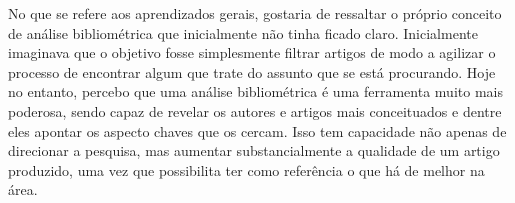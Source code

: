No que se refere aos aprendizados gerais, gostaria de ressaltar o próprio conceito de análise bibliométrica que inicialmente não tinha ficado claro. Inicialmente imaginava que o objetivo fosse simplesmente filtrar artigos de modo a agilizar o processo de encontrar algum que trate do assunto que se está procurando. Hoje no entanto, percebo que uma análise bibliométrica é uma ferramenta muito mais poderosa, sendo capaz de revelar os autores e artigos mais conceituados e dentre eles apontar os aspecto chaves que os cercam. Isso tem capacidade não apenas de direcionar a pesquisa, mas aumentar substancialmente a qualidade de um artigo produzido, uma vez que possibilita ter como referência o que há de melhor na área.
